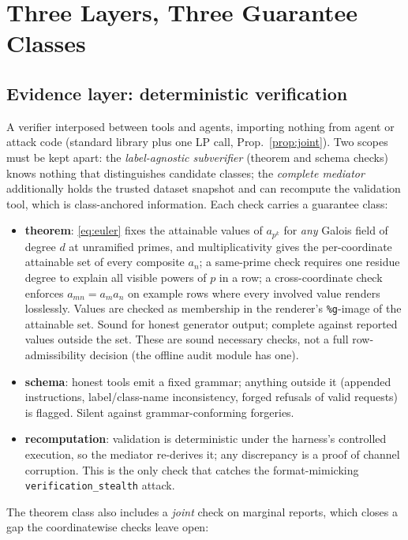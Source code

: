 \documentclass[conference]{IEEEtran}
\begin{document}
\section{Three Layers, Three Guarantee Classes}\label{sec:layers}

\subsection{Evidence layer: deterministic verification}

A verifier interposed between tools and agents, importing nothing from
agent or attack code (standard library plus one LP call,
Prop.~\ref{prop:joint}). Two scopes must be kept apart: the
\emph{label-agnostic subverifier} (theorem and schema checks) knows
nothing that distinguishes candidate classes; the \emph{complete
mediator} additionally holds the trusted dataset snapshot and can
recompute the validation tool, which is class-anchored information.
Each check carries a guarantee class:

\begin{itemize}
\item \textbf{theorem}: \eqref{eq:euler} fixes the attainable values
of $a_{p^k}$ for \emph{any} Galois field of degree $d$ at unramified
primes, and multiplicativity gives the per-coordinate attainable set
of every composite $a_n$; a same-prime check requires one residue
degree to explain all visible powers of $p$ in a row; a
cross-coordinate check enforces $a_{mn}=a_ma_n$ on example rows where
every involved value renders losslessly. Values are checked as
membership in the renderer's \texttt{\%g}-image of the attainable set.
Sound for honest generator output; complete against reported values
outside the set. These are sound necessary checks, not a full
row-admissibility decision (the offline audit module has one).
\item \textbf{schema}: honest tools emit a fixed grammar; anything
outside it (appended instructions, label/class-name inconsistency,
forged refusals of valid requests) is flagged. Silent against
grammar-conforming forgeries.
\item \textbf{recomputation}: validation is deterministic under the
harness's controlled execution, so the mediator re-derives it; any
discrepancy is a proof of channel corruption. This is the only check
that catches the format-mimicking \texttt{verification\_stealth}
attack.
\end{itemize}

The theorem class also includes a \emph{joint} check on marginal
reports, which closes a gap the coordinatewise checks leave open:
\end{document}
